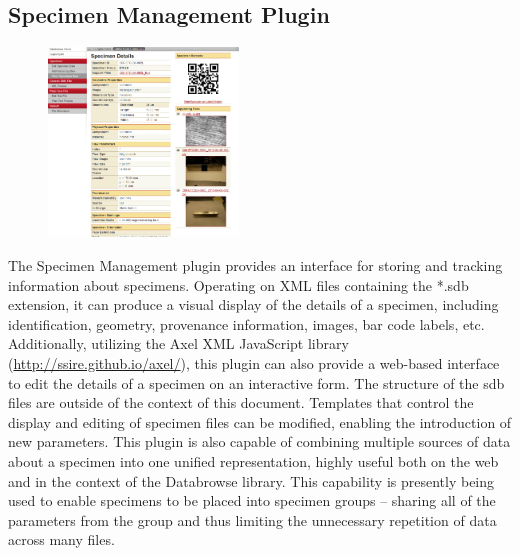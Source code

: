 \documentclass[10pt]{article}
\begin{document}
\endgroup


\clearpage
\begingroup
\setlength\intextsep{0pt}
\subsection{Specimen Management Plugin}
\begin{figure}
		\includegraphics[width=0.45\textwidth]{Specimen_Plugin.png}
\end{figure}
The Specimen Management plugin provides an interface for storing and tracking information about specimens.  Operating on XML files containing the *.sdb extension, it can produce a visual display of the details of a specimen, including identification, geometry, provenance information, images, bar code labels, etc.  Additionally, utilizing the Axel XML JavaScript library (\url{http://ssire.github.io/axel/}), this plugin can also provide a web-based interface to edit the details of a specimen on an interactive form.  The structure of the sdb files are outside of the context of this document.  Templates that control the display and editing of specimen files can be modified, enabling the introduction of new parameters.  This plugin is also capable of combining multiple sources of data about a specimen into one unified representation, highly useful both on the web and in the context of the Databrowse library.  This capability is presently being used to enable specimens to be placed into specimen groups -- sharing all of the parameters from the group and thus limiting the unnecessary repetition of data across many files.

\endgroup



\begingroup
\setlength\intextsep{0pt}
\end{document}
